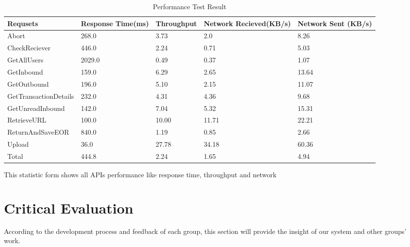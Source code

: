 \documentclass[runningheads]{llncs}
\begin{document}
	\begin{table}[H] %
    	\centering
    	\caption{Performance Test Result}
    	\label{table:Performance Test Result} 
    	\begin{threeparttable}
    		\begin{tabular} {p{3.3cm}|p{2cm}<{\centering}|p{2cm}<{\centering}|p{2.5cm}<{\centering}|p{2.5cm}<{\centering}}    	
    		\toprule
      		Requsets & Response Time(ms) &  Throughput &  Network Recieved(KB/s) & Network Sent (KB/s)  \\
      		\midrule
      		Abort & 268.0 & 3.73 & 2.0 & 8.26 \\
        	\hline
        	CheckReciever & 446.0 & 2.24 & 0.71 & 5.03 \\
        	\hline
        	GetAllUsers & 2029.0 & 0.49 & 0.37 & 1.07 \\
        	\hline
        	GetInbound & 159.0 & 6.29 & 2.65 & 13.64 \\
        	\hline
        	GetOutbound & 196.0 & 5.10 & 2.15 & 11.07 \\
        	\hline
        	GetTransactionDetails & 232.0 & 4.31 & 4.36 & 9.68 \\
        	\hline
        	GetUnreadInbound & 142.0 & 7.04 & 5.32 & 15.31 \\
        	\hline
        	RetrieveURL & 100.0 & 10.00 & 11.71 & 22.21 \\
        	\hline
        	ReturnAndSaveEOR & 840.0 & 1.19 & 0.85 & 2.66 \\
        	\hline
        	Upload & 36.0 & 27.78 & 34.18 & 60.36 \\
        	\hline
        	Total & 444.8 & 2.24 & 1.65 & 4.94 \\
      		\bottomrule
    		\end{tabular}
    		\begin{tablenotes}
          		\footnotesize
          		\item This statistic form shows all APIs performance like response time, throughput and network 
        	\end{tablenotes}
    	\end{threeparttable}   
	\end{table}

\section{Critical Evaluation}
According to the development process and feedback of each group, this section will provide the insight of our system and other groups' work.
\end{document}
